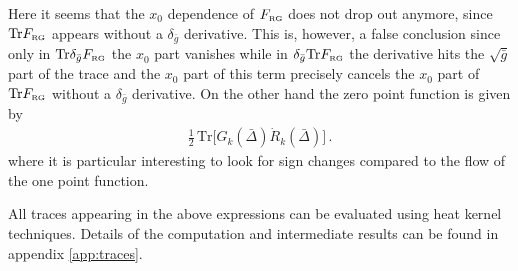 \documentclass[11pt]{book} %
\newcommand{\Tr}{\mathrm{Tr}}
\begin{document}
{Here it seems that the $x_0$ dependence of $F_{\text{\tiny RG}}$ does not drop out anymore,
since $\Tr F_{\text{\tiny RG}}$ appears without a $\delta_{\bar g}$ derivative.
This is, however, a false conclusion since only in $\Tr \delta_{\bar g} F_{\text{\tiny RG}}$ the $x_0$ part vanishes
while in $\delta_{\bar g} \Tr F_{\text{\tiny RG}}$ the derivative hits the $\sqrt{\bar g}$ part of the trace
and the $x_0$ part of this term precisely cancels the $x_0$ part of $\Tr F_{\text{\tiny RG}}$ without a $\delta_{\bar g}$ derivative.
On the other hand the zero point function is given by
\begin{align}
  \frac 12 \, \Tr \Big[ G_k(\bar \Delta) \dot R_k(\bar \Delta) \Big] \,.
  \label{eq:background_flow}
\end{align}
where it is particular interesting to look for sign changes compared to the flow of the one point function.

All traces appearing in the above expressions can be evaluated using heat kernel techniques.
Details of the computation and intermediate results can be found in appendix \ref{app:traces}.

}
\end{document}
